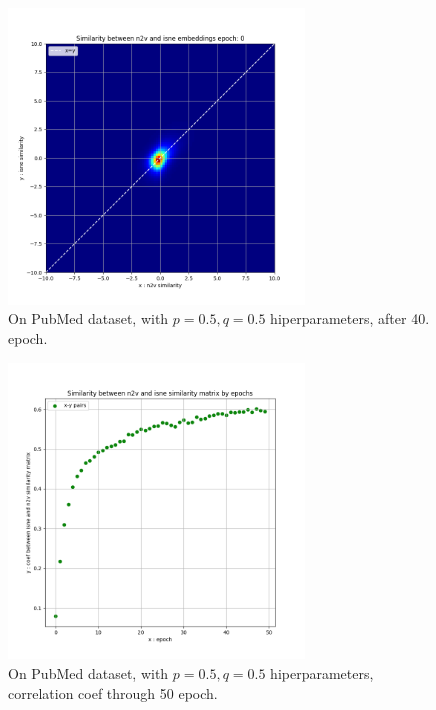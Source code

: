 \begin{figure}[ht!]
	\centering
	\includegraphics[width=0.70\textwidth]{figures/result_hm.png}
	\caption{On PubMed dataset, with ${p = 0.5, q =0.5}$ hiperparameters, after 40. epoch.}
	\label{result_hm}
\end{figure}

\begin{figure}[ht!]
	\centering
	\includegraphics[width=0.70\textwidth]{figures/Cora_05_05_coef_plot.png}
	\caption{On PubMed dataset, with ${p = 0.5, q =0.5}$ hiperparameters, correlation coef through 50 epoch.}
	\label{coef_res}
\end{figure}